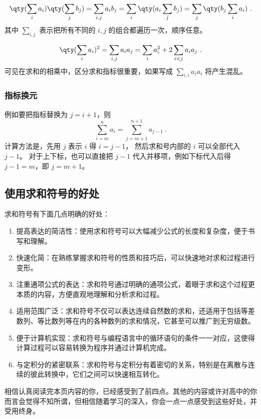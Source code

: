 \begin{equation}
\qty(\sum_i a_i) \qty(\sum_j b_j) = \sum_{i,j} a_i b_j = \sum_i \qty(a_i \sum_j b_j) = \sum_j \qty(b_j \sum_i a_i)~.
\end{equation}
其中 $\sum\limits_{i,j}$ 表示把所有不同的 $i,j$ 的组合都遍历一次，顺序任意。

\begin{equation}
\qty(\sum_i a_i)^2 = \sum_{i,j} a_i a_j = \sum_i a_i^2 + 2\sum_{i<j} a_i a_j~.
\end{equation}
可见在求和的相乘中，区分求和指标很重要，如果写成 $\sum\limits_{i,i} a_i a_i$ 将产生混乱。


\subsubsection{指标换元}

例如要把指标替换为 $j=i+1$，则
\begin{equation}
\sum_{i=m}^n a_i = \sum_{j=m+1}^{n+1} a_{j-1} ~.
\end{equation}
计算方法是，先用 $j$ 表示 $i$ 得 $i=j-1$， 然后求和号内部的 $i$ 可以全部代入 $j-1$。 对于上下标，也可以直接把 $j-1$ 代入并移项，例如下标代入后得 $j-1=m$，即 $j=m+1$。


\subsection{使用求和符号的好处}

求和符号有下面几点明确的好处：

\begin{enumerate}
\item 提高表达的简洁性：使用求和符号可以大幅减少公式的长度和复杂度，便于书写和理解。
\item 快速化简：在熟练掌握求和符号的性质和技巧后，可以快速地对求和过程进行变形。
\item 注重通项公式的表达：求和符号通过明确的通项公式，着眼于求和这个过程更本质的内容，方便直观地理解和分析求和过程。
\item 适用范围广泛：求和符号不仅可以表达连续自然数的求和，还适用于包括等差数列、等比数列等在内的各种数列的求和情况，它甚至可以推广到无穷级数。
\item 便于计算机实现：求和符号与编程语言中的循环语句的条件一一对应，这使得计算过程可以容易转换为程序并通过计算机完成。
\item 与定积分的紧密联系：求和符号与定积分有着密切的关系，特别是在离散与连续的彼此转换中，它们之间可以快速相互转化。
\end{enumerate}

相信认真阅读完本页内容的你，已经感受到了前四点。其他的内容或许对高中的你而言会觉得不知所谓，但相信随着学习的深入，你会一点一点感受到这些好处，并受用终身。